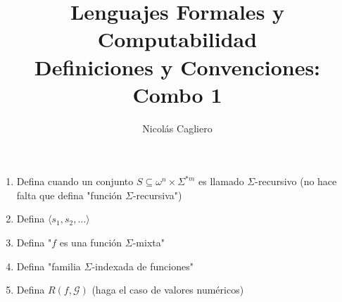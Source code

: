 \documentclass{article}
\title{Lenguajes Formales y Computabilidad \\
        \large Definiciones y Convenciones: Combo 1 }
\author{Nicolás Cagliero}
\begin{document}
\maketitle

\begin{enumerate}
    \item Defina cuando un conjunto $S \subseteq \omega^n \times \Sigma^{*m}$ 
    es llamado $\Sigma$-recursivo (no hace falta que defina "función $\Sigma$-recursiva")

    \item Defina $\langle s_1, s_2, \dots \rangle$
    
    \item Defina "$f$ es una función $\Sigma$-mixta"
    
    \item Defina "familia $\Sigma$-indexada de funciones"
    \item Defina $R(f, \mathcal{G})$ (haga el caso de valores numéricos)
\end{enumerate}
\end{document}
